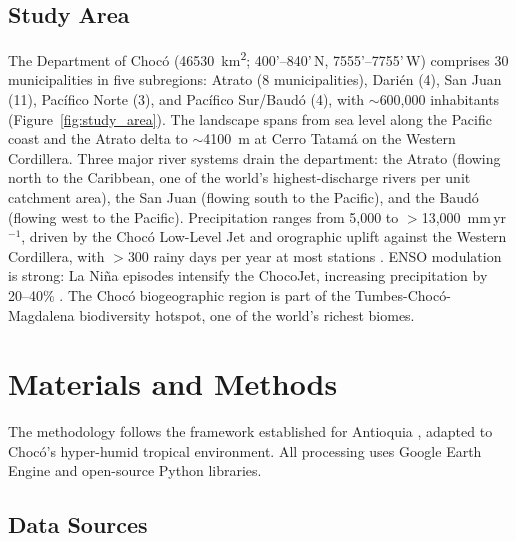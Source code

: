 \documentclass{article}
\begin{document}
\subsection{Study Area}
\label{sec:study_area}


The Department of Choc\'o (\SI{46530}{\kilo\metre\squared}; 4\textdegree{}00'--8\textdegree{}40'\,N, 75\textdegree{}55'--77\textdegree{}55'\,W) comprises 30 municipalities in five subregions: Atrato (8 municipalities), Dari\'en (4), San Juan (11), Pac\'ifico Norte (3), and Pac\'ifico Sur/Baud\'o (4), with $\sim$600,000 inhabitants (Figure~\ref{fig:study_area}). The landscape spans from sea level along the Pacific coast and the Atrato delta to $\sim$\SI{4100}{\metre} at Cerro Tatam\'a on the Western Cordillera. Three major river systems drain the department: the Atrato (flowing north to the Caribbean, one of the world's highest-discharge rivers per unit catchment area), the San Juan (flowing south to the Pacific), and the Baud\'o (flowing west to the Pacific). Precipitation ranges from 5,000 to $>$13,000~mm\,yr$^{-1}$, driven by the Choc\'o Low-Level Jet \citep{Poveda2023} and orographic uplift against the Western Cordillera, with $>$300 rainy days per year at most stations \citep{Urrea2019}. ENSO modulation is strong: La Ni\~na episodes intensify the ChocoJet, increasing precipitation by 20--40\% \citep{Poveda2001, Mesa2006, Mejia2021}. The Choc\'o biogeographic region is part of the Tumbes-Choc\'o-Magdalena biodiversity hotspot, one of the world's richest biomes.

\section{Materials and Methods}
\label{sec:methods}

The methodology follows the framework established for Antioquia \citep{EspinalMaya2026}, adapted to Choc\'o's hyper-humid tropical environment. All processing uses Google Earth Engine \citep{Gorelick2017} and open-source Python libraries.

\subsection{Data Sources}
\end{document}
